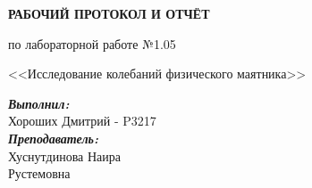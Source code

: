 \documentclass[12pt, a4paper]{article}
\begin{document}

\vspace*{0.25\textheight}
\begin{center}
\textbf{\LARGE РАБОЧИЙ ПРОТОКОЛ И ОТЧЁТ }

\LARGE по лабораторной работе №1.05

\LARGE <<Исследование колебаний физического маятника>>

\end{center}
\vspace*{5cm}
\begin{flushright}
\begin{minipage}{.33\linewidth}
\textit{\textbf{Выполнил:}}\\
Хороших Дмитрий - P3217\\
\textit{\textbf{Преподаватель:}}\\
Хуснутдинова Наира\\ Рустемовна
\end{minipage}
\end{flushright}


\thispagestyle{firstpage}
\newpage
\tableofcontents

\restoregeometry
\end{document}
